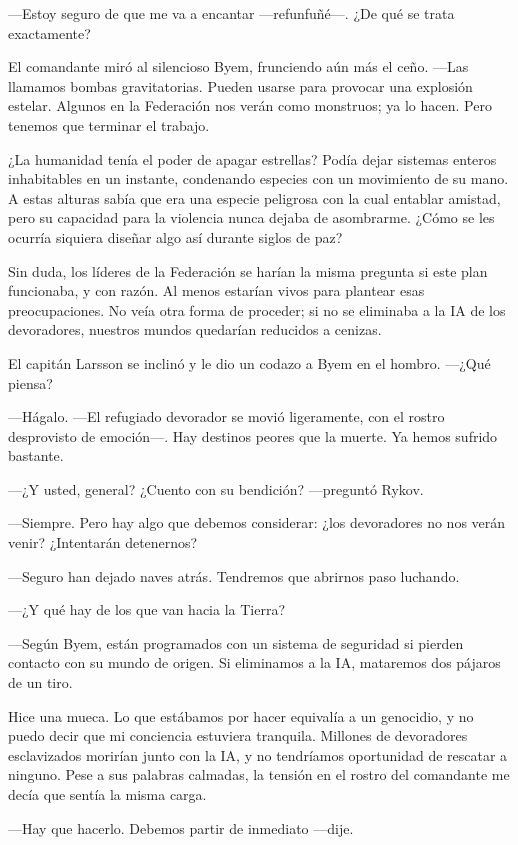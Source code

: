 —Estoy seguro de que me va a encantar —refunfuñé—. ¿De qué se trata exactamente?

El comandante miró al silencioso Byem, frunciendo aún más el ceño. —Las llamamos bombas gravitatorias. Pueden usarse para provocar una explosión estelar. Algunos en la Federación nos verán como monstruos; ya lo hacen. Pero tenemos que terminar el trabajo.

¿La humanidad tenía el poder de apagar estrellas? Podía dejar sistemas enteros inhabitables en un instante, condenando especies con un movimiento de su mano. A estas alturas sabía que era una especie peligrosa con la cual entablar amistad, pero su capacidad para la violencia nunca dejaba de asombrarme. ¿Cómo se les ocurría siquiera diseñar algo así durante siglos de paz?

Sin duda, los líderes de la Federación se harían la misma pregunta si este plan funcionaba, y con razón. Al menos estarían vivos para plantear esas preocupaciones. No veía otra forma de proceder; si no se eliminaba a la IA de los devoradores, nuestros mundos quedarían reducidos a cenizas.

El capitán Larsson se inclinó y le dio un codazo a Byem en el hombro. —¿Qué piensa?

—Hágalo. —El refugiado devorador se movió ligeramente, con el rostro desprovisto de emoción—. Hay destinos peores que la muerte. Ya hemos sufrido bastante.

 —¿Y usted, general? ¿Cuento con su bendición? —preguntó Rykov.

—Siempre. Pero hay algo que debemos considerar: ¿los devoradores no nos verán venir? ¿Intentarán detenernos?

—Seguro han dejado naves atrás. Tendremos que abrirnos paso luchando.

 —¿Y qué hay de los que van hacia la Tierra?

—Según Byem, están programados con un sistema de seguridad si pierden contacto con su mundo de origen. Si eliminamos a la IA, mataremos dos pájaros de un tiro.

Hice una mueca. Lo que estábamos por hacer equivalía a un genocidio, y no puedo decir que mi conciencia estuviera tranquila. Millones de devoradores esclavizados morirían junto con la IA, y no tendríamos oportunidad de rescatar a ninguno. Pese a sus palabras calmadas, la tensión en el rostro del comandante me decía que sentía la misma carga.

—Hay que hacerlo. Debemos partir de inmediato —dije.

